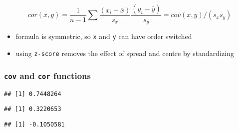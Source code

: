 \documentclass[
]{book}
\newenvironment{Shaded}{\begin{snugshade}}{\end{snugshade}}
\newcommand{\CommentTok}[1]{\textcolor[rgb]{0.56,0.35,0.01}{\textit{#1}}}
\newcommand{\FunctionTok}[1]{\textcolor[rgb]{0.00,0.00,0.00}{#1}}
\newcommand{\NormalTok}[1]{#1}
\newcommand{\SpecialCharTok}[1]{\textcolor[rgb]{0.00,0.00,0.00}{#1}}
\providecommand{\tightlist}{%
  \setlength{\itemsep}{0pt}\setlength{\parskip}{0pt}}
\theoremstyle{definition}
\theoremstyle{definition}
\theoremstyle{definition}
\theoremstyle{definition}
\theoremstyle{remark}
\begin{document}
\[
cor(x,y)=\frac{1}{n-1}\sum\frac{(x_i-\bar{x})}{s_x}\frac{(y_i-\bar{y})}{s_y}=cov(x,y)/(s_xs_y)
\]

\begin{itemize}
\tightlist
\item
  formula is symmetric, so \texttt{x} and \texttt{y} can have order switched
\item
  using \texttt{z-score} removes the effect of spread and centre by standardizing
\end{itemize}

\hypertarget{cov-and-cor-functions}{%
\subsubsection{\texorpdfstring{\texttt{cov} and \texttt{cor} functions}{cov and cor functions}}\label{cov-and-cor-functions}}

\begin{Shaded}
\end{Shaded}

\begin{verbatim}
## [1] 0.7448264
\end{verbatim}

\begin{Shaded}
\end{Shaded}

\begin{verbatim}
## [1] 0.3220653
\end{verbatim}

\begin{Shaded}
\end{Shaded}

\begin{verbatim}
## [1] -0.1050581
\end{verbatim}
\end{document}
